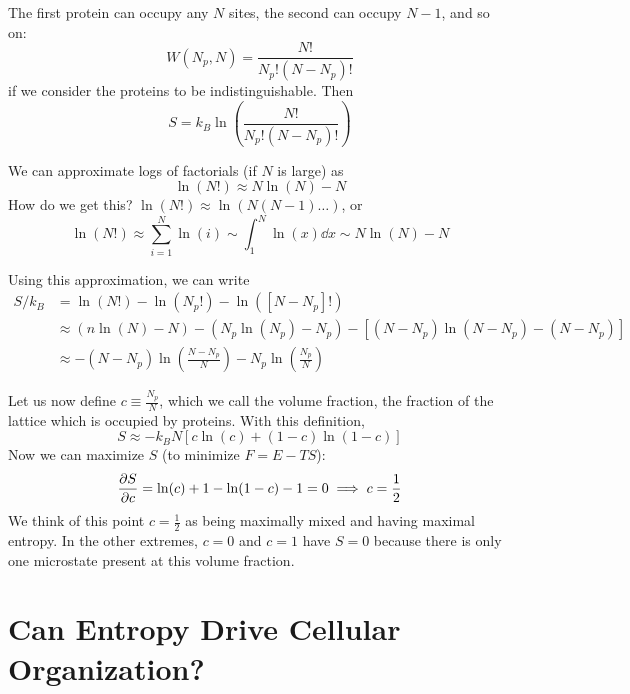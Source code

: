 \documentclass[a4paper,twoside,master.tex]{subfiles}
\begin{document}
The first protein can occupy any $ N $ sites, the second can occupy $ N-1 $, and so on:
\begin{equation}
    W(N_p, N) = \frac{N!}{N_p!(N-N_p)!}
\end{equation}
if we consider the proteins to be indistinguishable. Then
\begin{equation}
    S = k_B \ln(\frac{N!}{N_p!(N-N_p)!})
\end{equation}

We can approximate logs of factorials (if $ N $ is large) as
\begin{equation}
    \ln(N!) \approx N \ln(N) - N \tag{Stirling Approximation}
\end{equation}
How do we get this? $ \ln(N!) \approx \ln(N(N-1)\ldots) $, or
\begin{equation}
    \ln(N!) \approx \sum_{i=1}^{N} \ln(i) \sim \int_1^N \ln(x) \dd{x} \sim N \ln(N) - N
\end{equation}

Using this approximation, we can write
\begin{align}
    S/k_B &= \ln(N!) - \ln(N_p!) - \ln([N-N_p]!) \\
      &\approx (n \ln(N) - N) - (N_p \ln(N_p) - N_p) - [(N - N_p) \ln(N - N_p) - (N - N_p)] \\
      &\approx -(N-N_p) \ln(\frac{N - N_p}{N}) - N_p \ln(\frac{N_p}{N})
\end{align}

Let us now define $ c \equiv \frac{N_p}{N} $, which we call the volume fraction, the fraction of the lattice which is occupied by proteins. With this definition,
\begin{equation}
    S \approx -k_B N[c \ln(c) + (1-c) \ln(1-c)] \tag{Mixing Entropy}
\end{equation}
Now we can maximize $ S $ (to minimize $ F = E - TS $):
\begin{equation}
    \pdv{S}{c} = \ln(c) + 1 - \ln(1-c) - 1 = 0 \implies c = \frac{1}{2}
\end{equation}
We think of this point $ c = \frac{1}{2} $ as being maximally mixed and having maximal entropy. In the other extremes, $ c = 0 $ and $ c = 1 $ have $ S = 0 $ because there is only one microstate present at this volume fraction.

\section{Can Entropy Drive Cellular Organization?}\label{sec:can_entropy_drive_cellular_organization?}
\end{document}
